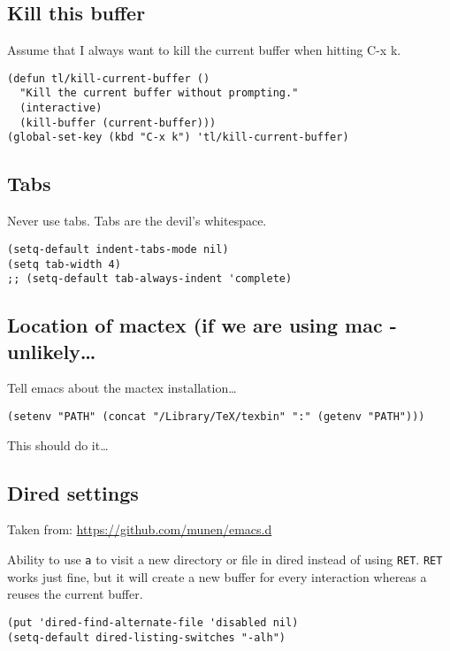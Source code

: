 \documentclass[12pt]{article}
\begin{document}
\subsection{Kill this buffer}
\label{sec:org1fc8b8b}
Assume that I always want to kill the current buffer when hitting C-x k.
\begin{verbatim}
(defun tl/kill-current-buffer ()
  "Kill the current buffer without prompting."
  (interactive)
  (kill-buffer (current-buffer)))
(global-set-key (kbd "C-x k") 'tl/kill-current-buffer)
\end{verbatim}

\subsection{Tabs}
\label{sec:org707ccae}
Never use tabs. Tabs are the devil’s whitespace.

\begin{verbatim}
(setq-default indent-tabs-mode nil)
(setq tab-width 4)
;; (setq-default tab-always-indent 'complete)
\end{verbatim}

\subsection{Location of mactex (if we are using mac - unlikely\ldots{}}
\label{sec:org526bf45}
Tell emacs about the mactex installation\ldots{}

\begin{verbatim}
(setenv "PATH" (concat "/Library/TeX/texbin" ":" (getenv "PATH")))
\end{verbatim}

This should do it\ldots{}

\subsection{Dired settings}
\label{sec:orgbcdb8c9}

Taken from: \url{https://github.com/munen/emacs.d}


Ability to use \texttt{a} to visit a new directory or file in dired instead of using \texttt{RET}.
\texttt{RET} works just fine, but it will create a new buffer for every interaction
whereas a reuses the current buffer.

\begin{verbatim}
(put 'dired-find-alternate-file 'disabled nil)
(setq-default dired-listing-switches "-alh")
\end{verbatim}
\end{document}
